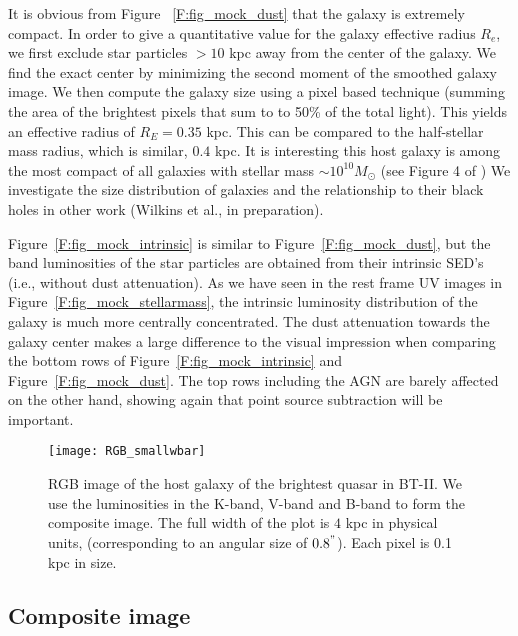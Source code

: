 \documentclass[twocolumn,useAMS,usenatbib]{mnras} \usepackage{natbib}
\begin{document}
It is obvious from Figure ~\ref{F:fig_mock_dust} that the galaxy is extremely compact. In order to give a quantitative value for the galaxy effective radius $R_{e}$, we first exclude star particles $>10$ kpc away from the center of the galaxy. We find the exact center by minimizing the second moment of the smoothed galaxy image.  We then compute the galaxy size using a pixel based technique (summing the area of the brightest pixels that sum to to 50\% of the total light). This yields an effective radius
of $R_{E}=0.35$ kpc. This can be compared to the half-stellar mass radius, which is similar, $0.4$ kpc.
It is interesting this host galaxy is among the most compact of all galaxies with stellar mass $\sim 10^{10}  M_{\odot}$ (see Figure 4 of \citep{2015ApJ...808L..17F}) We investigate the size distribution of galaxies and the relationship to their black holes in other work (Wilkins et al., in preparation).

Figure~\ref{F:fig_mock_intrinsic} is similar to Figure~\ref{F:fig_mock_dust}, but the band luminosities of the star particles are obtained from their intrinsic SED's (i.e., without dust 
attenuation). As we have seen in the rest frame UV images in  Figure~\ref{F:fig_mock_stellarmass}, the intrinsic luminosity distribution of the galaxy is much more centrally concentrated. The dust attenuation towards the galaxy center makes a large difference to the visual impression when comparing the bottom rows of Figure~\ref{F:fig_mock_intrinsic} and Figure~\ref{F:fig_mock_dust}.
The top rows including the AGN are barely affected on the other hand, showing again that point source subtraction will be important.



\begin{figure}
\hspace{-1.5cm}
\texttt{[image: RGB\_smallwbar]}
\caption{\label{F:fig_quasar_miri}  RGB image of the host galaxy of the brightest quasar in BT-II. We use the luminosities in the K-band, V-band and B-band to form the composite image. The full width of the plot is $4$ kpc in physical units, (corresponding to an angular size of $0.8^{"}$). Each pixel is 0.1 kpc in size.} 
\end{figure}


\subsection{Composite image}
\end{document}
